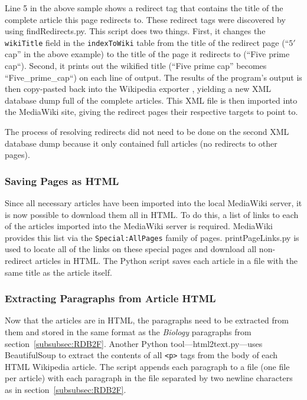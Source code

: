 Line 5 in the above sample shows a redirect tag that contains the title of the complete article this page redirects to.
These redirect tags were discovered by using findRedirects.py.
This script does two things.
First, it changes the {\tt wikiTitle} field in the {\tt indexToWiki} table from the title of the redirect page (``$5\prime$ cap'' in the above example) to the title of the page it redirects to (``Five prime cap``).
Second, it prints out the wikified title (``Five prime cap'' becomes ``Five\_prime\_cap``) on each line of output.
The results of the program's output is then copy-pasted back into the Wikipedia exporter \cite{wiki-exporter}, yielding a new XML database dump full of the complete articles.
This XML file is then imported into the MediaWiki site, giving the redirect pages their respective targets to point to.

The process of resolving redirects did not need to be done on the second XML database dump because it only contained full articles (no redirects to other pages).

\subsubsection{Saving Pages as HTML}

Since all necessary articles have been imported into the local MediaWiki server, it is now possible to download them all in HTML.
To do this, a list of links to each of the articles imported into the MediaWiki server is required.
MediaWiki provides this list via the {\tt Special:AllPages} family of pages.
printPageLinks.py is used to locate all of the links on these special pages and download all non-redirect articles in HTML.
The Python script saves each article in a file with the same title as the article itself.

\subsubsection{Extracting Paragraphs from Article HTML}

Now that the articles are in HTML, the paragraphs need to be extracted from them and stored in the same format as the {\it Biology} paragraphs from section~\ref{subsubsec:RDB2F}.
Another Python tool---html2text.py---uses BeautifulSoup \cite{beautifulsoup} to extract the contents of all {\tt <p>} tags from the body of each HTML Wikipedia article.
The script appends each paragraph to a file (one file per article) with each paragraph in the file separated by two newline characters as in section~\ref{subsubsec:RDB2F}.

